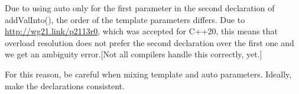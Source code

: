 Due to using auto only for the first parameter in the second declaration of addValInto(), the order of the template parameters differs. Due to \url{http://wg21.link/p2113r0}, which was accepted for C++20, this means that overload resolution does not prefer the second declaration over the first one and we get an ambiguity error.[Not all compilers handle this correctly, yet.]

For this reason, be careful when mixing template and auto parameters. Ideally, make the declarations consistent.











